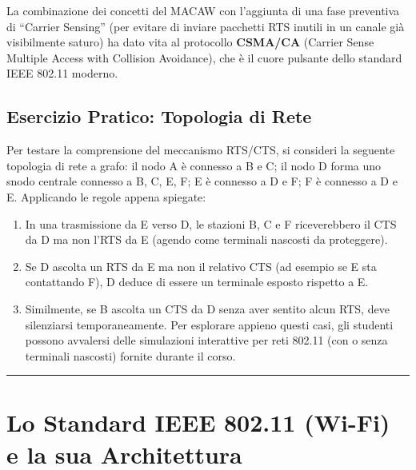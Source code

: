 \documentclass[
  italian,
  openany]{book}
\begin{document}
La combinazione dei concetti del MACAW con l'aggiunta di una fase
preventiva di ``Carrier Sensing'' (per evitare di inviare pacchetti RTS
inutili in un canale già visibilmente saturo) ha dato vita al protocollo
\textbf{CSMA/CA} (Carrier Sense Multiple Access with Collision
Avoidance), che è il cuore pulsante dello standard IEEE 802.11 moderno.

\subsection{Esercizio Pratico: Topologia di
Rete}\label{esercizio-pratico-topologia-di-rete}

Per testare la comprensione del meccanismo RTS/CTS, si consideri la
seguente topologia di rete a grafo: il nodo A è connesso a B e C; il
nodo D forma uno snodo centrale connesso a B, C, E, F; E è connesso a D
e F; F è connesso a D e E. Applicando le regole appena spiegate:

\begin{enumerate}
\def\labelenumi{\arabic{enumi}.}
\item
  In una trasmissione da E verso D, le stazioni B, C e F riceverebbero
  il CTS da D ma non l'RTS da E (agendo come terminali nascosti da
  proteggere).
\item
  Se D ascolta un RTS da E ma non il relativo CTS (ad esempio se E sta
  contattando F), D deduce di essere un terminale esposto rispetto a E.
\item
  Similmente, se B ascolta un CTS da D senza aver sentito alcun RTS,
  deve silenziarsi temporaneamente. Per esplorare appieno questi casi,
  gli studenti possono avvalersi delle simulazioni interattive per reti
  802.11 (con o senza terminali nascosti) fornite durante il corso.
\end{enumerate}

\begin{center}\rule{0.5\linewidth}{0.5pt}\end{center}

\section{Lo Standard IEEE 802.11 (Wi-Fi) e la sua
Architettura}\label{lo-standard-ieee-802.11-wi-fi-e-la-sua-architettura}
\end{document}
